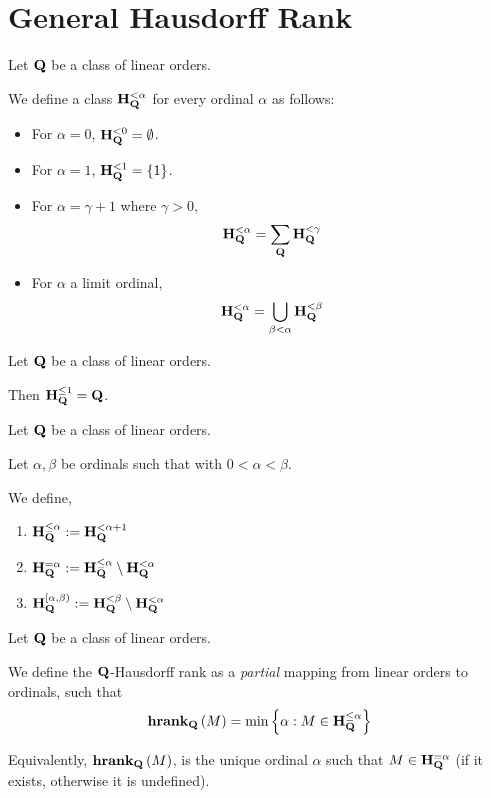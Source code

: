 \section{General Hausdorff Rank}

\begin{definition}
  Let $\mathbf{Q}$ be a class of linear orders.

  We define a class $\mathbf{H}_{\mathbf{Q}}^{< \alpha}$
  for every ordinal $\alpha$ as follows:

  \begin{itemize}
    \item For $\alpha = 0$, $\mathbf{H}_{\mathbf{Q}}^{< 0} = \emptyset$.
    \item For $\alpha = 1$, $\mathbf{H}_{\mathbf{Q}}^{< 1} = \left\{ {1} \right\}$.
    \item For $\alpha = \gamma + 1$ where $\gamma > 0$,
          \[\mathbf{H}_{\mathbf{Q}}^{< \alpha} = \sum_{\mathbf{Q}}{\mathbf{H}_{\mathbf{Q}}^{< \gamma}}\]
    \item For $\alpha$ a limit ordinal,
          \[\mathbf{H}_{\mathbf{Q}}^{< \alpha} = \bigcup_{\beta < \alpha} \mathbf{H}_{\mathbf{Q}}^{< \beta}\]
  \end{itemize}

\end{definition}

\begin{example}
  Let $\mathbf{Q}$ be a class of linear orders.

  Then $\mathbf{H}_{\mathbf{Q}}^{\le 1} = \mathbf{Q}$.
\end{example}

\begin{definition}
  Let $\mathbf{Q}$ be a class of linear orders.

  Let $\alpha, \beta$ be ordinals such that with $0 < \alpha < \beta$.

  We define,
  \begin{enumerate}
    \item $\mathbf{H}_{\mathbf{Q}}^{\le \alpha} := \mathbf{H}_{\mathbf{Q}}^{< \alpha + 1}$
    \item $\mathbf{H}_{\mathbf{Q}}^{= \alpha} := \mathbf{H}_{\mathbf{Q}}^{\le \alpha} \setminus \mathbf{H}_{\mathbf{Q}}^{< \alpha}$
    \item $\mathbf{H}_{\mathbf{Q}}^{[\alpha, \beta)} := \mathbf{H}_{\mathbf{Q}}^{< \beta} \setminus \mathbf{H}_{\mathbf{Q}}^{< \alpha}$
  \end{enumerate}
\end{definition}

\begin{definition}
  Let $\mathbf{Q}$ be a class of linear orders.

  We define the $\mathbf{Q}$-Hausdorff rank as a \emph{partial} mapping
  from linear orders to ordinals, such that
  \[
    \mathbf{hrank}_{\mathbf{Q}} \left( {M} \right) = \min \left\{ {\alpha : M \in \mathbf{H}_{\mathbf{Q}}^{\le \alpha}} \right\}
  \]

  Equivalently, $\mathbf{hrank}_{\mathbf{Q}} \left( {M} \right)$, is the unique ordinal $\alpha$ such that
  $M \in \mathbf{H}_{\mathbf{Q}}^{= \alpha}$ (if it exists, otherwise it is undefined).

\end{definition}


